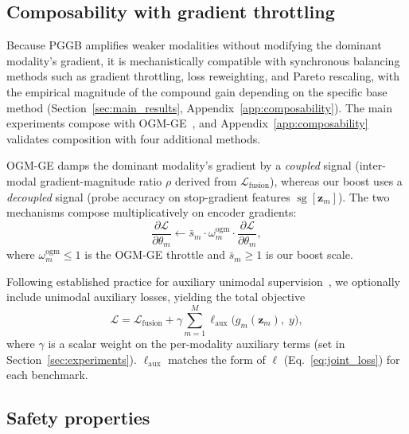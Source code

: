 \documentclass{article}
\newcommand{\loss}{\mathcal{L}}
\newcommand{\sg}{\operatorname{sg}}
\begin{document}
\subsection{Composability with gradient throttling}
\label{sec:compose}

Because PGGB amplifies weaker modalities without modifying the dominant modality's gradient, it is mechanistically compatible with synchronous balancing methods such as gradient throttling, loss reweighting, and Pareto rescaling, with the empirical magnitude of the compound gain depending on the specific base method (Section~\ref{sec:main_results}, Appendix~\ref{app:composability}). The main experiments compose with OGM-GE~\citep{peng2022ogmge}, and Appendix~\ref{app:composability} validates composition with four additional methods.

OGM-GE damps the dominant modality's gradient by a \emph{coupled} signal (inter-modal gradient-magnitude ratio $\rho$ derived from $\loss_{\text{fusion}}$), whereas our boost uses a \emph{decoupled} signal (probe accuracy on stop-gradient features $\sg[\mathbf{z}_m]$). The two mechanisms compose multiplicatively on encoder gradients:
%
\begin{equation}
\label{eq:combined}
\frac{\partial \loss}{\partial \theta_m} \leftarrow \bar{s}_m \cdot \omega_m^{\text{ogm}} \cdot \frac{\partial \loss}{\partial \theta_m},
\end{equation}
%
where $\omega_m^{\text{ogm}} \leq 1$ is the OGM-GE throttle and $\bar{s}_m \geq 1$ is our boost scale. 

Following established practice for auxiliary unimodal supervision~\citep{guo2024cggm}, we optionally include unimodal auxiliary losses, yielding the total objective
%
\begin{equation}
\label{eq:total_loss}
\loss = \loss_{\text{fusion}} + \gamma \sum_{m=1}^{M} \ell_{\text{aux}}\!\bigl(g_m(\mathbf{z}_m),\; y\bigr),
\end{equation}
%
where $\gamma$ is a scalar weight on the per-modality auxiliary terms (set in Section~\ref{sec:experiments}). $\ell_{\text{aux}}$ matches the form of $\ell$ (Eq.~\ref{eq:joint_loss}) for each benchmark.


\subsection{Safety properties}
\label{sec:convergence}
\end{document}
